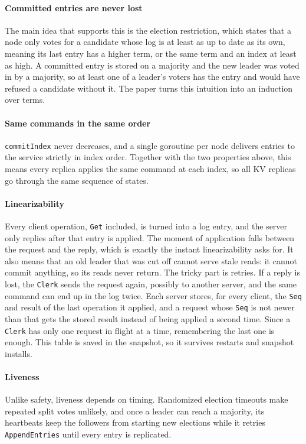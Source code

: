 \documentclass[conference]{IEEEtran}
\begin{document}
\paragraph{Committed entries are never lost} The main idea that supports this is the election restriction, which states that a node only votes for a candidate whose log is at least as up to date as its own, meaning its last entry has a higher term, or the same term and an index at least as high. A committed entry is stored on a majority and the new leader was voted in by a majority, so at least one of a leader's voters has the entry and would have refused a candidate without it. The paper turns this intuition into an induction over terms.

\paragraph{Same commands in the same order} \texttt{commitIndex} never decreases, and a single goroutine per node delivers entries to the service strictly in index order. Together with the two properties above, this means every replica applies the same command at each index, so all KV replicas go through the same sequence of states. 

\paragraph{Linearizability} Every client operation, \texttt{Get} included, is turned into a log entry, and the server only replies after that entry is applied. The moment of application falls between the request and the reply, which is exactly the instant linearizability asks for. It also means that an old leader that was cut off cannot serve stale reads: it cannot commit anything, so its reads never return. The tricky part is retries. If a reply is lost, the \texttt{Clerk} sends the request again, possibly to another server, and the same command can end up in the log twice. Each server stores, for every client, the \texttt{Seq} and result of the last operation it applied, and a request whose \texttt{Seq} is not newer than that gets the stored result instead of being applied a second time. Since a \texttt{Clerk} has only one request in flight at a time, remembering the last one is enough. This table is saved in the snapshot, so it survives restarts and snapshot installs.

\paragraph{Liveness} Unlike safety, liveness depends on timing. Randomized election timeouts make repeated split votes unlikely, and once a leader can reach a majority, its heartbeats keep the followers from starting new elections while it retries \texttt{AppendEntries} until every entry is replicated.
\end{document}
